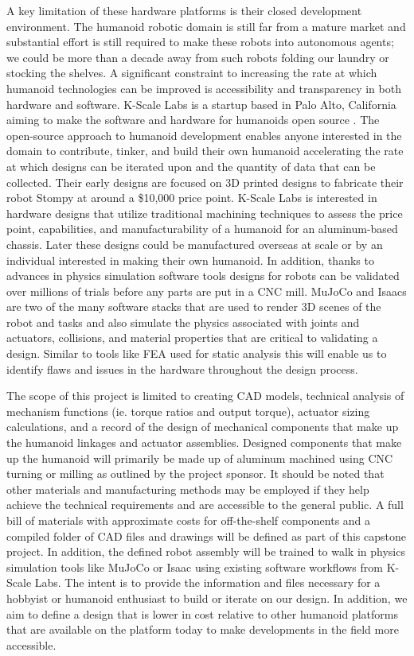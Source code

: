 \documentclass{article}
\begin{document}
A key limitation of these hardware platforms is their closed development environment. The humanoid robotic domain is still far from a mature market and substantial effort is still required to make these robots into autonomous agents; we could be more than a decade away from such robots folding our laundry or stocking the shelves. A significant constraint to increasing the rate at which humanoid technologies can be improved is accessibility and transparency in both hardware and software. K-Scale Labs is a startup based in Palo Alto, California aiming to make the software and hardware for humanoids open source \cite{yscale2024}. The open-source approach to humanoid development enables anyone interested in the domain to contribute, tinker, and build their own humanoid accelerating the rate at which designs can be iterated upon and the quantity of data that can be collected. Their early designs are focused on 3D printed designs to fabricate their robot Stompy at around a \$10,000 price point. K-Scale Labs is interested in hardware designs that utilize traditional machining techniques to assess the price point, capabilities, and manufacturability of a humanoid for an aluminum-based chassis. Later these designs could be manufactured overseas at scale or by an individual interested in making their own humanoid. In addition, thanks to advances in physics simulation software tools designs for robots can be validated over millions of trials before any parts are put in a CNC mill. MuJoCo and Isaacs are two of the many software stacks that are used to render 3D scenes of the robot and tasks and also simulate the physics associated with joints and actuators, collisions, and material properties that are critical to validating a design. Similar to tools like FEA used for static analysis this will enable us to identify flaws and issues in the hardware throughout the design process. 

The scope of this project is limited to creating CAD models, technical analysis of mechanism functions (ie. torque ratios and output torque), actuator sizing calculations, and a record of the design of mechanical components that make up the humanoid linkages and actuator assemblies. Designed components that make up the humanoid will primarily be made up of aluminum machined using CNC turning or milling as outlined by the project sponsor. It should be noted that other materials and manufacturing methods may be employed if they help achieve the technical requirements and are accessible to the general public. A full bill of materials with approximate costs for off-the-shelf components and a compiled folder of CAD files and drawings will be defined as part of this capstone project. In addition, the defined robot assembly will be trained to walk in physics simulation tools like MuJoCo or Isaac using existing software workflows from K-Scale Labs. The intent is to provide the information and files necessary for a hobbyist or humanoid enthusiast to build or iterate on our design. In addition, we aim to define a design that is lower in cost relative to other humanoid platforms that are available on the platform today to make developments in the field more accessible. 
\end{document}
